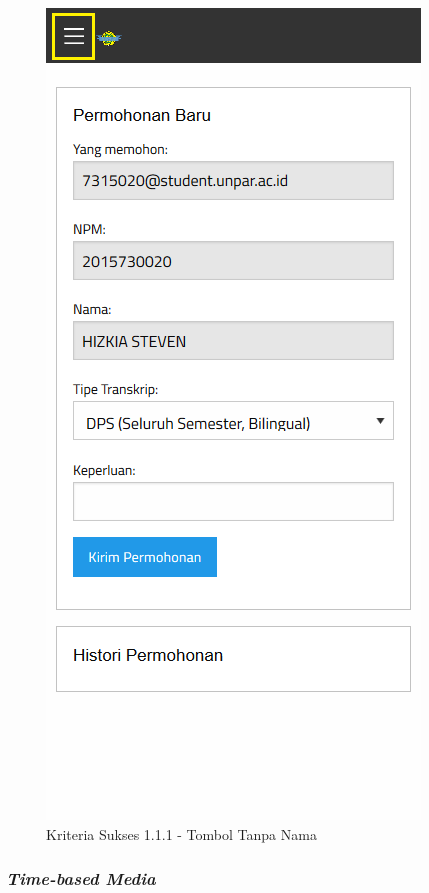 \documentclass[a4paper,twoside]{article}
\begin{document}
\begin{enumerate}
		\begin{figure}[H]
			\centering  
			\includegraphics[scale=0.3, frame]{kriteria-sukses-1-1-1-non-text-content}  
			\caption[Kriteria Sukses 1.1.1 - Tombol Tanpa Nama]{Kriteria Sukses 1.1.1 - Tombol Tanpa Nama}
			\label{fig:1.1.1_non_text_content}  
		\end{figure} 

		\subsubsection*{\textit{Time-based Media}}
		\label{subsubsec:kepatuhan_bluetape_time_based_media}


\end{enumerate}
\end{document}
